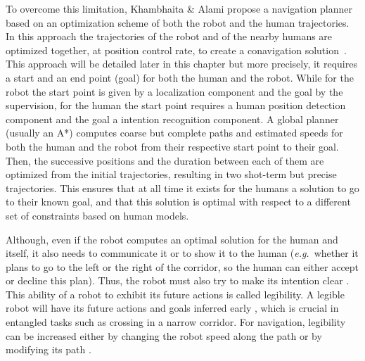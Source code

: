 \documentclass[a4paper,11pt,twoside]{StyleThese}
\begin{document}
\medskip

To overcome this limitation, Khambhaita \& Alami propose a navigation planner based on an optimization scheme of both the robot and the human trajectories. In this approach the trajectories of the robot and of the nearby humans are optimized together, at position control rate, to create a conavigation solution~\cite{khambhaita_viewing_2017}. This approach will be detailed later in this chapter but more precisely, it requires a start and an end point (goal) for both the human and the robot. While for the robot the start point is given by a localization component and the goal by the supervision, for the human the start point requires a human position detection component and the goal a intention recognition component. A global planner (usually an A*) computes coarse but complete paths and estimated speeds for both the human and the robot from their respective start point to their goal. Then, the successive positions and the duration between each of them are optimized from the initial trajectories, resulting in two shot-term but precise trajectories. This ensures that at all time it exists for the humans a solution to go to their known goal, and that this solution is optimal with respect to a different set of constraints based on human models.

Although, even if the robot computes an optimal solution for the human and itself, it also needs to communicate it or to show it to the human (\textit{e.g.}~whether it plans to go to the left or the right of the corridor, so the human can either accept or decline this plan). Thus, the robot must also try to make its intention clear \cite{pacchierotti_evaluation_2006}. This ability of a robot to exhibit its future actions is called legibility. A legible robot will have its future actions and goals inferred early \cite{dragan_legibility_2013}, which is crucial in entangled tasks such as crossing in a narrow corridor. For navigation, legibility can be increased either by changing the robot speed along the path \cite{kruse_legible_2012} or by modifying its path \cite{khambhaita_viewing_2017}.
\end{document}
